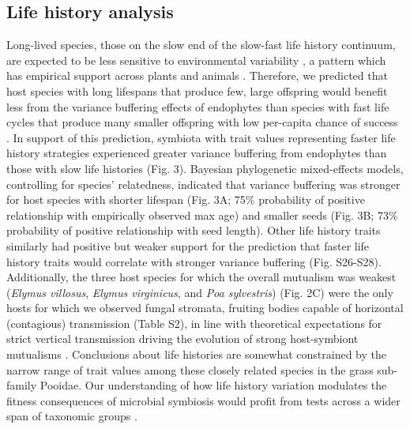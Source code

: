 \documentclass[9pt,twocolumn,twoside]{pnas-new}
\begin{document}
\subsection*{Life history analysis}
Long-lived species, those on the slow end of the slow-fast life history continuum, are expected to be less sensitive to environmental variability \cite{murphy1968pattern}, a pattern which has empirical support across plants \cite{compagnoni2021herbaceous} and animals \cite{le2022life,morris2008longevity}.
Therefore, we predicted that host species with long lifespans that produce few, large offspring would benefit less from the variance buffering effects of endophytes than species with fast life cycles that produce many smaller offspring with low per-capita chance of success \cite{rees1996evolutionary,moles2004seedling}.
In support of this prediction, symbiota with trait values representing faster life history strategies experienced greater variance buffering from endophytes than those with slow life histories (Fig. 3).
Bayesian phylogenetic mixed-effects models, controlling for species' relatedness, indicated that variance buffering was stronger for host species with shorter lifespan (Fig. 3A; 75\% probability of positive relationship with empirically observed max age) and smaller seeds (Fig. 3B; 73\% probability of positive relationship with seed length).
Other life history traits similarly had positive but weaker support for the prediction that faster life history traits would correlate with stronger variance buffering (Fig. S26-S28).
Additionally, the three host species for which the overall mutualism was weakest (\emph{Elymus villosus}, \emph{Elymus virginicus}, and \emph{Poa sylvestris}) (Fig. 2C) were the only hosts for which we observed fungal stromata, fruiting bodies capable of horizontal (contagious) transmission (Table S2), in line with theoretical expectations for strict vertical transmission driving the evolution of strong host-symbiont mutualisms \cite{fine1975vectors, afkhami2008symbiosis}.
Conclusions about life histories are somewhat constrained by the narrow range of trait values among these closely related species in the grass sub-family Pooidae. 
Our understanding of how life history variation modulates the fitness consequences of microbial symbiosis would profit from tests across a wider span of taxonomic groups \cite{jeschke2009roles}.
\end{document}
